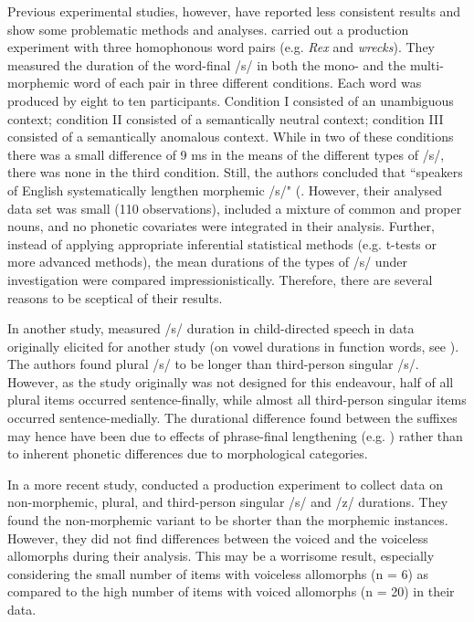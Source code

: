 Previous experimental studies, however, have reported less consistent results and show some problematic methods and analyses. \citet{Walsh1983} carried out a production experiment with three homophonous word pairs (e.g. \textit{Rex} and \textit{wrecks}). They measured the duration of the word-final /s/ in both the mono- and the multi-morphemic word of each pair in three different conditions. Each word was produced by eight to ten participants. Condition I consisted of an unambiguous context; condition II consisted of a semantically neutral context; condition III consisted of a semantically anomalous context.  While in two of these conditions there was a small difference of 9 ms in the means of the different types of /s/, there was none in the third condition. Still, the authors concluded that ``speakers of English systematically lengthen morphemic /s/" (\citet[204]{Walsh1983}. However, their analysed data set was small (110 observations), included a mixture of common and proper nouns, and no phonetic covariates were integrated in their analysis. Further, instead of applying appropriate inferential statistical methods (e.g. t-tests or more advanced methods), the mean durations of the types of /s/ under investigation were compared impressionistically. Therefore, there are several reasons to be sceptical of their results.

In another study, \citet{Hsieh1999} measured /s/ duration in child-directed speech in data originally elicited for another study (on vowel durations in function words, see \cite{Swanson1994}). The authors found plural /s/ to be longer than third-person singular /s/. However, as the study originally was not designed for this endeavour, half of all plural items occurred sentence-finally, while almost all third-person singular items occurred sentence-medially. The durational difference found between the suffixes may hence have been due to effects of phrase-final lengthening (e.g. \cite{Klatt1976,Wightman1992}) rather than to inherent phonetic differences due to morphological categories. 

In a more recent study, \citet{Seyfarth2017} conducted a production experiment to collect data on non-morphemic, plural, and third-person singular /s/ and /z/ durations. They found the non-morphemic variant to be shorter than the morphemic instances. However, they did not find differences between the voiced and the voiceless allomorphs during their analysis. This may be a worrisome result, especially considering the small number of items with voiceless allomorphs (n = 6) as compared to the high number of items with voiced allomorphs (n = 20) in their data. 

